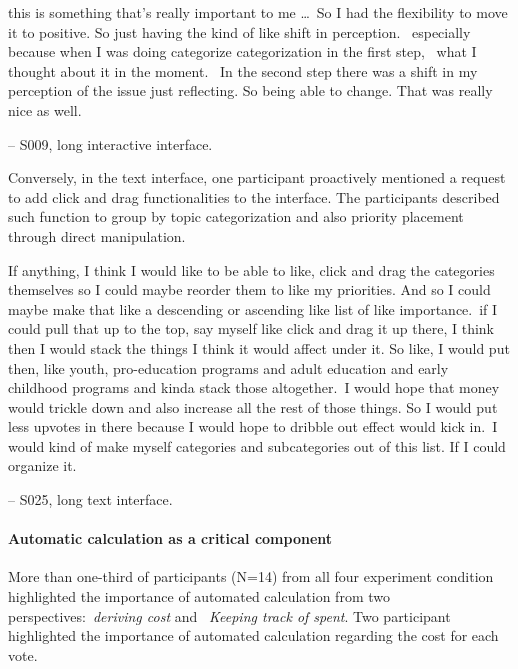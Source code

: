 \begin{displayquote}
\bracketellipsis this is something that's really important to me \ldots\ So I had the flexibility to move it to positive. So just having the kind of like shift in perception. ~\bracketellipsis especially because when I was doing categorize categorization in the first step, ~\bracketellipsis what I thought about it in the moment. ~\bracketellipsis In the second step there was a shift in my perception of the issue just reflecting. So being able to change. That was really nice as well. 

\noindent \hfill -- S009, long interactive interface.
\end{displayquote}

Conversely, in the text interface, one participant proactively mentioned a request to add click and drag functionalities to the interface. The participants described such function to group by topic categorization and also priority placement through direct manipulation. 

\begin{displayquote}
If anything, I think I would like to be able to like, click and drag the categories themselves so I could maybe reorder them to like my priorities. And so I could maybe make that like a descending or ascending like list of like importance.~\bracketellipsis if I could pull that up to the top, say myself like click and drag it up there, I think then I would stack the things I think it would affect under it. So like, I would put then, like youth, pro-education programs and adult education and early childhood programs and kinda stack those altogether.~\bracketellipsis I would hope that money would trickle down and also increase all the rest of those things. So I would put less upvotes in there because I would hope to dribble out effect would kick in.~\bracketellipsis I would kind of make myself categories and subcategories out of this list. If I could organize it.

\noindent \hfill -- S025, long text interface.
\end{displayquote}

\paragraph{Automatic calculation as a critical component}
More than one-third of participants (N=14) from all four experiment condition highlighted the importance of automated calculation from two perspectives:~\textit{deriving cost} and ~\textit{Keeping track of spent}. Two participant highlighted the importance of automated calculation regarding the cost for each vote.

